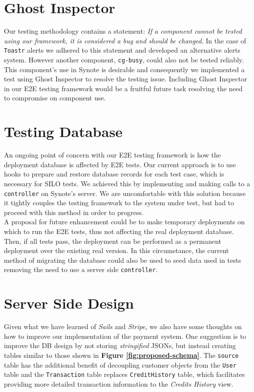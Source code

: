 \section{Ghost Inspector}
\label{subsec:ghost-inspector}

Our testing methodology contains a statement: \textit{If a component cannot be tested using our framework, it is considered a bug and should be changed}. In the case of \texttt{Toastr} alerts we adhered to this statement and developed an alternative alerts system. However another component, \texttt{cg-busy}, could also not be tested reliably. This component's use in Synote is desirable and consequently we implemented a test using Ghost Inspector to resolve the testing issue. Including Ghost Inspector in our E2E testing framework would be a fruitful future task resolving the need to compromise on component use.

\section{Testing Database}
\label{subsec:testing-database}

An ongoing point of concern with our E2E testing framework is how the deployment database is affected by E2E tests. Our current approach is to use hooks to prepare and restore database records for each test case, which is necessary for SILO tests. We achieved this by implementing and making calls to a \texttt{controller} on Synote's server. We are uncomfortable with this solution because it tightly couples the testing framework to the system under test, but had to proceed with this method in order to progress.\\

A proposal for future enhancement could be to make temporary deployments on which to run the E2E tests, thus not affecting the real deployment database. Then, if all tests pass, the deployment can be performed as a permanent deployment over the existing real version. In this circumstance, the current method of migrating the database could also be used to seed data used in tests removing the need to use a server side \texttt{controller}.

\section{Server Side Design}
\label{subsec:server-side-design}

Given what we have learned of \textit{Sails} and \textit{Stripe}, we also have some thoughts on how to improve our implementation of the payment system. One suggestion is to improve the DB design by not storing \textit{stringified} JSONs, but instead creating tables similar to those shown in \textbf{Figure \ref{fig:proposed-schema}}. The \texttt{source} table has the additional benefit of decoupling customer objects from the \texttt{User} table and the \texttt{Transaction} table replaces \texttt{CreditHistory} table, which facilitates providing more detailed transaction information to the \textit{Credits History} view.\\

